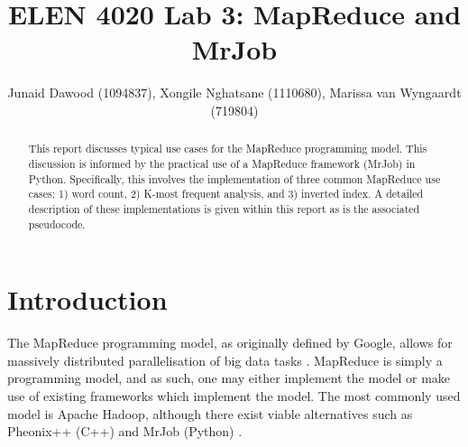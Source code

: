 \documentclass[journal,10pt]{IEEEtran}
\begin{document}
%
\title{ELEN 4020 Lab 3: MapReduce and MrJob}
%
%
%
\author{Junaid Dawood (1094837), Xongile Nghatsane (1110680), Marissa van Wyngaardt (719804)}%



\maketitle


\begin{abstract}
This report discusses typical use cases for the MapReduce programming model. This discussion is informed by the practical use of a MapReduce framework (MrJob) in Python. Specifically, this involves the implementation of three common MapReduce use cases: 1) word count, 2) K-most frequent analysis, and 3) inverted index. A detailed description of these implementations is given within this report as is the associated pseudocode.
\end{abstract}

\IEEEpeerreviewmaketitle

\section{Introduction}
The MapReduce programming model, as originally defined by Google, allows for massively distributed parallelisation of big data tasks  \cite{mapr}. MapReduce is simply a programming model, and as such, one may either implement the model or make use of existing frameworks which implement the model. The most commonly used model is Apache Hadoop, although there exist viable alternatives such as Pheonix++ (C++) and MrJob (Python) \cite{ApacheHa84:online,GitHubko90:online,mrjob:online}.
\end{document}
